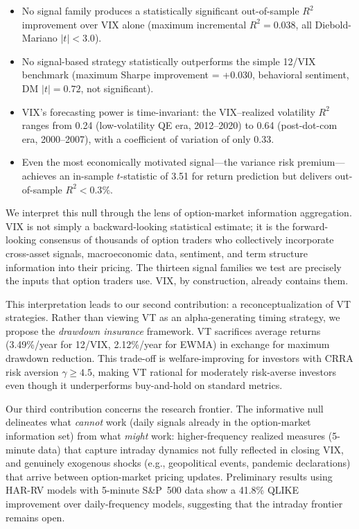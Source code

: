 \documentclass[12pt,a4paper]{article}
\begin{document}
\begin{itemize}
    \item No signal family produces a statistically significant out-of-sample $R^2$ improvement over VIX alone (maximum incremental $R^2 = 0.038$, all Diebold-Mariano $|t| < 3.0$).
    \item No signal-based strategy statistically outperforms the simple 12/VIX benchmark (maximum Sharpe improvement = +0.030, behavioral sentiment, DM $|t| = 0.72$, not significant).
    \item VIX's forecasting power is time-invariant: the VIX--realized volatility $R^2$ ranges from 0.24 (low-volatility QE era, 2012--2020) to 0.64 (post-dot-com era, 2000--2007), with a coefficient of variation of only 0.33.
    \item Even the most economically motivated signal---the variance risk premium---achieves an in-sample $t$-statistic of 3.51 for return prediction but delivers out-of-sample $R^2 < 0.3\%$.
\end{itemize}

We interpret this null through the lens of option-market information aggregation. VIX is not simply a backward-looking statistical estimate; it is the forward-looking consensus of thousands of option traders who collectively incorporate cross-asset signals, macroeconomic data, sentiment, and term structure information into their pricing. The thirteen signal families we test are precisely the inputs that option traders use. VIX, by construction, already contains them.

This interpretation leads to our second contribution: a reconceptualization of VT strategies. Rather than viewing VT as an alpha-generating timing strategy, we propose the \emph{drawdown insurance} framework. VT sacrifices average returns (3.49\%/year for 12/VIX, 2.12\%/year for EWMA) in exchange for maximum drawdown reduction. This trade-off is welfare-improving for investors with CRRA risk aversion $\gamma \geq 4.5$, making VT rational for moderately risk-averse investors even though it underperforms buy-and-hold on standard metrics.

Our third contribution concerns the research frontier. The informative null delineates what \emph{cannot} work (daily signals already in the option-market information set) from what \emph{might} work: higher-frequency realized measures (5-minute data) that capture intraday dynamics not fully reflected in closing VIX, and genuinely exogenous shocks (e.g., geopolitical events, pandemic declarations) that arrive between option-market pricing updates. Preliminary results using HAR-RV models with 5-minute S\&P~500 data show a 41.8\% QLIKE improvement over daily-frequency models, suggesting that the intraday frontier remains open.
\end{document}
